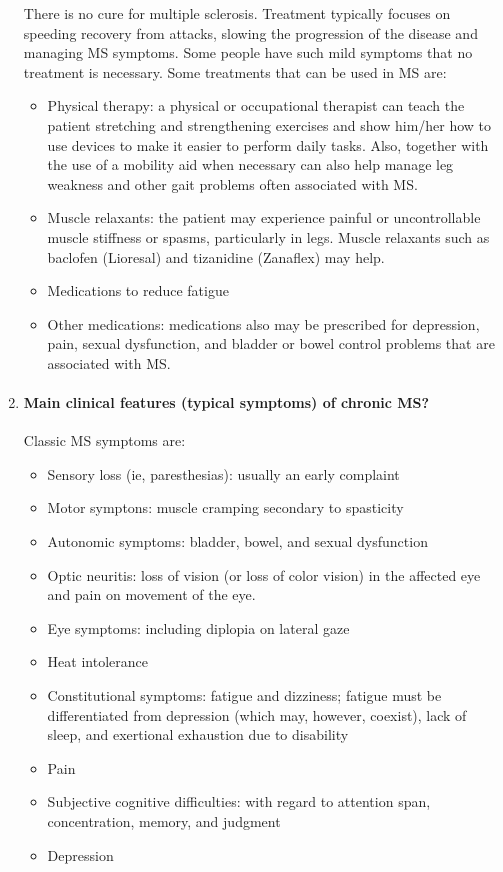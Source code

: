 \documentclass[12pt,article,oneside,a4paper]{memoir}
\begin{document}
\begin{enumerate}
There is no cure for multiple sclerosis. Treatment typically focuses on
speeding recovery from attacks, slowing the progression of the disease and
managing MS symptoms. Some people have such mild symptoms that no treatment is
necessary.
Some treatments that can be used in MS are:
\begin{itemize}
\item Physical therapy: a physical or occupational therapist can teach the
patient stretching and strengthening exercises and show him/her how to use
devices to make it easier to perform daily tasks. Also, together with the use
of a mobility aid when necessary can also help manage leg weakness and other
gait problems often associated with MS.
\item Muscle relaxants: the patient may experience painful or uncontrollable
muscle stiffness or spasms, particularly in legs. Muscle relaxants such as
baclofen (Lioresal) and tizanidine (Zanaflex) may help.
\item Medications to reduce fatigue
\item Other medications: medications also may be prescribed for depression,
pain, sexual dysfunction, and bladder or bowel control problems that are
associated with MS.
\end{itemize}

\item \paragraph{Main clinical features (typical symptoms) of chronic MS?}
\label{question:MS-symptoms}

Classic MS symptoms are:
\begin{itemize}
\item Sensory loss (ie, paresthesias): usually an early complaint
\item Motor symptons: muscle cramping secondary to spasticity
\item Autonomic symptoms: bladder, bowel, and sexual dysfunction
\item Optic neuritis: loss of vision (or loss of color vision) in the affected
eye and pain on movement of the eye. 
\item Eye symptoms: including diplopia on lateral gaze
\item Heat intolerance
\item Constitutional symptoms: fatigue and dizziness; fatigue must be
differentiated from depression (which may, however, coexist), lack of sleep,
and exertional exhaustion due to disability
\item Pain
\item Subjective cognitive difficulties: with regard to attention span,
concentration, memory, and judgment
\item Depression
\end{itemize}


\end{enumerate}
\end{document}
